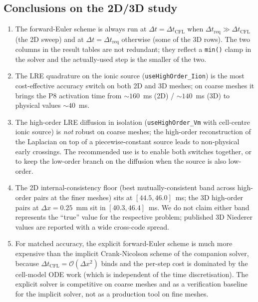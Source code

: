 \documentclass[11pt,a4paper]{article}
\newcommand{\code}[1]{\texttt{\small #1}}
\begin{document}
\subsection{Conclusions on the 2D/3D study}
\label{sec:results:conclusions}

\begin{enumerate}[leftmargin=*]
\item The forward-Euler scheme is always run at $\Delta t =
\Delta t_{\text{CFL}}$ when $\Delta t_{\text{req}} \gg
\Delta t_{\text{CFL}}$ (the 2D sweep) and at $\Delta t =
\Delta t_{\text{req}}$ otherwise (some of the 3D rows). The two
columns in the result tables are not redundant; they reflect a
\code{min()} clamp in the solver and the actually-used
step is the smaller of the two.
\item The LRE quadrature on the ionic source
(\code{useHighOrder\_Iion}) is the most cost-effective accuracy
switch on both 2D and 3D meshes; on coarse meshes it brings the
P8 activation time from $\sim 160$~ms (2D) / $\sim 140$~ms (3D)
to physical values $\sim 40$~ms.
\item The high-order LRE diffusion in isolation
(\code{useHighOrder\_Vm} with cell-centre ionic source) is
\emph{not} robust on coarse meshes; the high-order reconstruction
of the Laplacian on top of a piecewise-constant source leads to
non-physical early crossings. The recommended use is to enable
both switches together, or to keep the low-order branch on the
diffusion when the source is also low-order.
\item The 2D internal-consistency floor (best mutually-consistent
band across high-order pairs at the finer meshes) sits at
$[44.5, 46.0]$~ms; the 3D high-order pairs at $\Delta x = 0.25$~mm
sit in $[40.3, 46.4]$~ms. We do not claim either band represents
the ``true'' value for the respective problem; published 3D
Niederer values are reported with a wide cross-code spread.
\item For matched accuracy, the explicit forward-Euler scheme is
much more expensive than the implicit Crank-Nicolson scheme of the
companion solver, because $\Delta t_{\text{CFL}} = \mathcal{O}
(\Delta x^{2})$ binds and the per-step cost is dominated by the
cell-model ODE work (which is independent of the time
discretisation). The explicit solver is competitive on coarse
meshes and as a verification baseline for the implicit solver,
not as a production tool on fine meshes.
\end{enumerate}

\appendix
\end{document}
